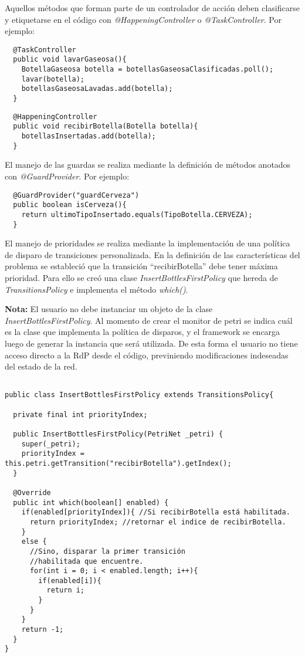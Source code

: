 Aquellos métodos que forman parte de un controlador de acción deben
clasificarse y etiquetarse en el código con \emph{@HappeningController} o
\emph{@TaskController}. Por ejemplo:\\

\begin{verbatim}
  @TaskController
  public void lavarGaseosa(){
    BotellaGaseosa botella = botellasGaseosaClasificadas.poll();
    lavar(botella);
    botellasGaseosaLavadas.add(botella);
  }
\end{verbatim}

\begin{verbatim}
  @HappeningController
  public void recibirBotella(Botella botella){
    botellasInsertadas.add(botella);
  }
\end{verbatim}

El manejo de las guardas se realiza mediante la definición de métodos anotados
con \emph{@GuardProvider}. Por ejemplo:\\

\begin{verbatim}
  @GuardProvider("guardCerveza")
  public boolean isCerveza(){
    return ultimoTipoInsertado.equals(TipoBotella.CERVEZA);
  }
\end{verbatim}

El manejo de prioridades se realiza mediante la implementación de una política
de disparo de transiciones personalizada. En la definición de las
características del problema se estableció que la transición ``recibirBotella''
debe tener máxima prioridad. Para ello se creó una clase
\emph{InsertBottlesFirstPolicy} que hereda de \emph{TransitionsPolicy} e
implementa el método \emph{which()}. 

\begin{framed}
\textbf{Nota:} El usuario no debe instanciar un objeto de la clase
\emph{InsertBottlesFirstPolicy}. Al momento de crear el monitor de petri se
indica cuál es la clase que implementa la política de disparos, y el framework
se encarga luego de generar la instancia que será utilizada. De esta forma el
usuario no tiene acceso directo a la RdP desde el código, previniendo
modificaciones indeseadas del estado de la red.
\end{framed}


\begin{verbatim}

public class InsertBottlesFirstPolicy extends TransitionsPolicy{

  private final int priorityIndex;

  public InsertBottlesFirstPolicy(PetriNet _petri) { 
    super(_petri); 
    priorityIndex = this.petri.getTransition("recibirBotella").getIndex(); 
  }
  
  @Override
  public int which(boolean[] enabled) {
    if(enabled[priorityIndex]){ //Si recibirBotella está habilitada.
      return priorityIndex; //retornar el indice de recibirBotella.
    }
    else {
      //Sino, disparar la primer transición 
      //habilitada que encuentre.
      for(int i = 0; i < enabled.length; i++){
        if(enabled[i]){
          return i; 
        }
      }
    }
    return -1;
  }
}
\end{verbatim}

